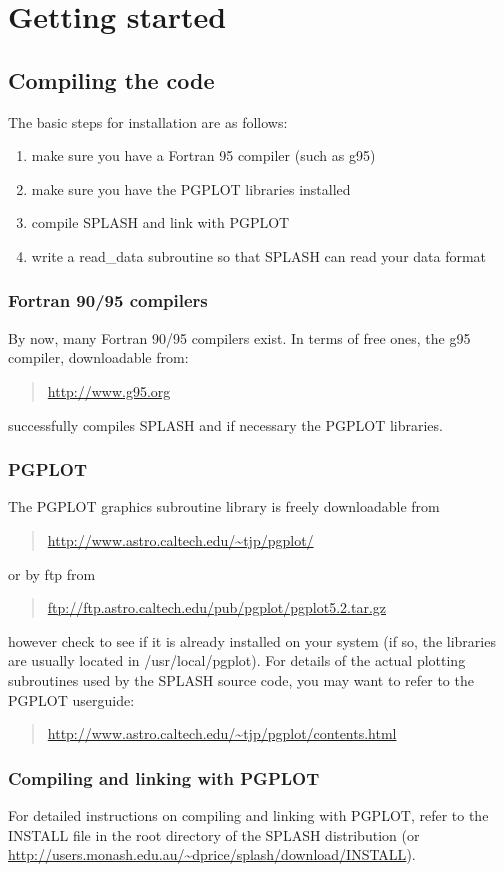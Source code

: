 \documentclass[a4paper,10pt]{article}
\newcommand{\splash}{\textsc{SPLASH }}
\begin{document}
\section{Getting started}
\subsection{Compiling the code}
The basic steps for installation are as follows:
\begin{enumerate}
\item make sure you have a Fortran 95 compiler (such as g95)
\item make sure you have the PGPLOT libraries installed
\item compile \splash and link with PGPLOT
\item write a read\_data subroutine so that \splash can read your data format
\end{enumerate}

\subsubsection{ Fortran 90/95 compilers}
 By now, many Fortran 90/95 compilers exist. In terms of free ones, the g95 compiler, downloadable from:
\begin{quote}
\url{http://www.g95.org}
\end{quote}
successfully compiles \splash and if necessary the PGPLOT libraries.

\subsubsection{ PGPLOT}
 The PGPLOT graphics subroutine library is freely downloadable from
\begin{quote}
\url{http://www.astro.caltech.edu/~tjp/pgplot/}
\end{quote}
or by ftp from
\begin{quote}
\url{ftp://ftp.astro.caltech.edu/pub/pgplot/pgplot5.2.tar.gz}
\end{quote}
however check to see if it is already installed on your system (if so, the libraries are
usually located in /usr/local/pgplot). For details of the actual plotting subroutines
used by the \splash source code, you may want to refer to the PGPLOT userguide:
\begin{quote}
\url{http://www.astro.caltech.edu/~tjp/pgplot/contents.html}
\end{quote}

\subsubsection{ Compiling and linking with PGPLOT}
For detailed instructions on compiling and linking with PGPLOT, refer to the INSTALL file in the root directory of the \splash distribution (or \url{http://users.monash.edu.au/~dprice/splash/download/INSTALL}).
\end{document}
